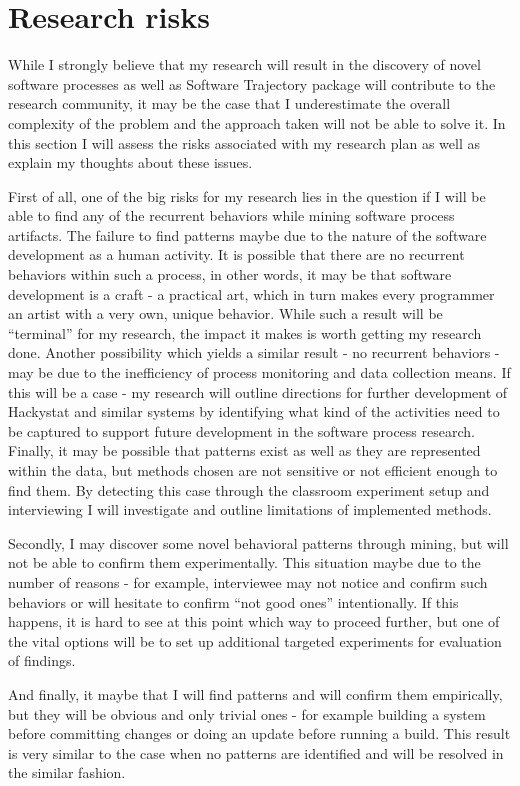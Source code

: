 \documentclass{sig-alternate}
\begin{document}
\section{Research risks}
While I strongly believe that my research will result in the discovery of novel software processes as well as Software Trajectory package will contribute to the research community, it may be the case that I underestimate the overall complexity of the problem and the approach taken will not be able to solve it. In this section I will assess the risks associated with my research plan as well as explain my thoughts about these issues.

First of all, one of the big risks for my research lies in the question if I will be able to find any of the recurrent behaviors while mining software process artifacts. The failure to find patterns maybe due to the nature of the software development as a human activity. It is possible that there are no recurrent behaviors within such a process, in other words, it may be that software development is a craft - a practical art, which in turn makes every programmer an artist with a very own, unique behavior. While such a result will be ``terminal'' for my research, the impact it makes is worth getting my research done. Another possibility which yields a similar result - no recurrent behaviors - may be due to the inefficiency of process monitoring and data collection means. If this will be a case - my research will outline directions for further development of Hackystat and similar systems by identifying what kind of the activities need to be captured to support future development in the software process research. Finally, it may be possible that patterns exist as well as they are represented within the data, but methods chosen are not sensitive or not efficient enough to find them. By detecting this case through the classroom experiment setup and interviewing I will investigate and outline limitations of implemented methods.

Secondly, I may discover some novel behavioral patterns through mining, but will not be able to confirm them experimentally. This situation maybe due to the number of reasons - for example, interviewee may not notice and confirm such behaviors or will hesitate to confirm ``not good ones'' intentionally. If this happens, it is hard to see at this point which way to proceed further, but one of the vital options will be to set up additional targeted experiments for evaluation of findings.

And finally, it maybe that I will find patterns and will confirm them empirically, but they will be obvious and only trivial ones - for example building a system before committing changes or doing an update before running a build. This result is very similar to the case when no patterns are identified and will be resolved in the similar fashion.
\end{document}
